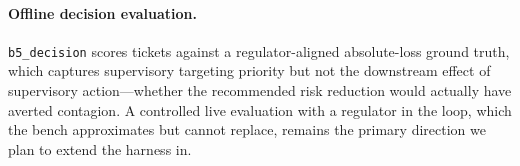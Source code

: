 \paragraph{Offline decision evaluation.}
\texttt{b5\_decision} scores tickets against a regulator-aligned
absolute-loss ground truth, which captures supervisory targeting
priority but not the downstream effect of supervisory action---whether
the recommended risk reduction would actually have averted
contagion. A controlled live evaluation with a regulator in the
loop, which the bench approximates but cannot replace, remains the
primary direction we plan to extend the harness in.
